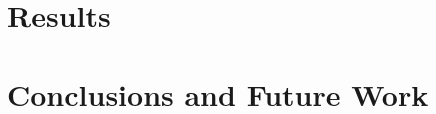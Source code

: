 \documentclass[portrait]{usydposter}
\begin{document}
\begin{multicols}{3}
\section{Results}

\section{Conclusions and Future Work}




\end{multicols}
\end{document}
